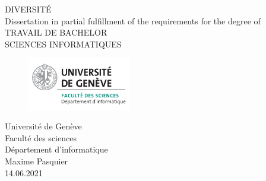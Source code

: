 
\thispagestyle{empty}

\vspace*{+5em}
\begin{center}
DIVERSITÉ\\
\vspace*{+8em}
Dissertation in partial fulfillment of the requirements for the degree of\\
\vspace{+2em}
TRAVAIL DE BACHELOR\\
SCIENCES INFORMATIQUES\\

\vspace*{+3em}
\begin{figure}[H]
\centering
\includegraphics[width=0.4\textwidth]{Images/unige_csd.png}
\end{figure}

\vspace*{+3em}
Université de Genève\\
Faculté des sciences\\
Département d'informatique\\
\vspace*{+2em}
Maxime Pasquier\\

\vspace*{+12em}
14.06.2021

\end{center}